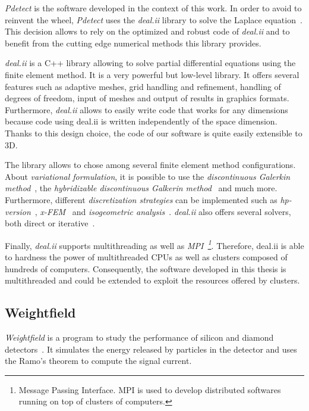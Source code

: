\documentclass[11pt]{article}
\begin{document}
	  \textit{Pdetect} is the software developed in the context of this work.
		In order to avoid to reinvent the wheel, \textit{Pdetect} uses the \textit{deal.ii} library
		to solve the Laplace equation~\cite{Bangerth:2007:DGO:1268776.1268779}. This decision allows to rely on the optimized
		and robust code of \textit{deal.ii} and to benefit from the cutting edge numerical methods this library provides.

		\textit{deal.ii} is a C++ library allowing to solve partial differential equations
		using the finite element method. It is a very powerful but low-level library.
		It offers several features such as adaptive meshes, grid handling
		and refinement, handling of degrees of freedom, input of meshes and output of results in
		graphics formats. Furthermore, \textit{deal.ii} allows to easily write code that works
		for any dimensions because code using deal.ii is written independently of the space
		dimension. Thanks to this design choice, the code of our software is quite easily
		extensible to 3D.


				The library allows to chose among several finite element method configurations.
				About \textit{variational formulation}, it is possible to use the
				\textit{discontinuous Galerkin method}~\cite{dealii_Galerkin},
				the \textit{hybridizable discontinuous Galkerin method}~\cite{dealii_Galerkin_hybrid} and much more.
				Furthermore, different \textit{discretization strategies} can be implemented such as
				\textit{hp-version}~\cite{hp_fem}, \textit{x-FEM}~\cite{CarraroWetterauer:2015}
				and \textit{isogeometric analysis}~\cite{dealII83}. \textit{deal.ii} also
				offers several solvers, both direct or iterative~\cite{deal.ii.solvers}.


		Finally, \textit{deal.ii} supports multithreading as well as \textit{MPI~\footnote{Message
		Passing Interface. MPI is used to develop distributed softwares running on top of
		clusters of computers.}}. Therefore,
		deal.ii is able to hardness the power of multithreaded CPUs as well as
		clusters composed of hundreds of computers. Consequently,
		the software developed in this thesis is multithreaded and could be extended to
		exploit the resources offered by clusters.

	\subsection{Weightfield}

		\textit{Weightfield} is a program to study the performance of silicon and diamond
		detectors~\cite{Cenna2015}. It simulates the energy released by particles in the detector
		and uses the Ramo's theorem to compute the signal current.
\end{document}
